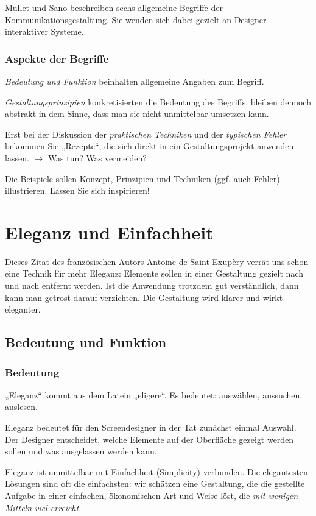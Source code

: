 Mullet und Sano beschreiben sechs allgemeine Begriffe der Kommunikationsgestaltung. Sie wenden sich dabei gezielt an Designer interaktiver Systeme.

\subsubsection*{Aspekte der Begriffe}
\emph{Bedeutung und Funktion} beinhalten allgemeine Angaben zum Begriff.

\emph{Gestaltungsprinzipien} konkretisierten die Bedeutung des Begriffs, bleiben dennoch abstrakt in dem Sinne, dass man sie nicht unmittelbar umsetzen kann.

Erst bei der Diskussion der \emph{praktischen Techniken} und der \emph{typischen Fehler} bekommen Sie „Rezepte“, die sich direkt in ein Gestaltungsprojekt anwenden lassen. $\to$ Was tun? Was vermeiden?

Die Beispiele sollen Konzept, Prinzipien und Techniken (ggf. auch Fehler) illustrieren. Lassen Sie sich inspirieren!

\section{Eleganz und Einfachheit}
Dieses Zitat des französischen Autors Antoine de Saint Exupèry verrät uns schon eine Technik für mehr Eleganz: Elemente sollen in einer Gestaltung gezielt nach und nach entfernt werden. Ist die Anwendung trotzdem gut verständlich, dann kann man getrost darauf verzichten. Die Gestaltung wird klarer und wirkt eleganter.

\subsection{Bedeutung und Funktion}
\subsubsection*{Bedeutung}
„Eleganz“ kommt aus dem Latein „eligere“. Es bedeutet: auswählen, aussuchen, auslesen.  

Eleganz bedeutet für den Screendesigner in der Tat zunächst einmal Auswahl. Der Designer entscheidet, welche Elemente auf der Oberfläche gezeigt werden sollen und was ausgelassen werden kann.

Eleganz ist unmittelbar mit Einfachheit (Simplicity) verbunden. Die elegantesten Lösungen sind oft die einfachsten: wir schätzen eine Gestaltung, die die gestellte Aufgabe in einer einfachen, ökonomischen Art und Weise löst, die \emph{mit wenigen Mitteln viel erreicht}.

